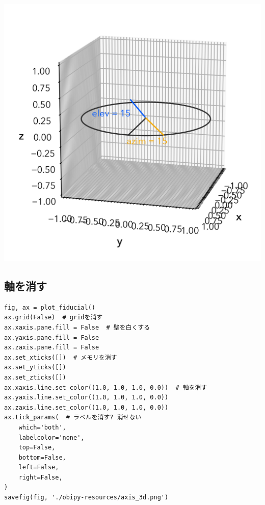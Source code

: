 \documentclass[a4paper, 10pt, notitlepage, twocolumn, uplatex, oneside, dvipdfmx]{jsarticle}
\begin{document}
\label{}
\begin{center}
\includegraphics[width=1.0\linewidth]{./obipy-resources/view_3d.png}
\end{center}
\subsection{軸を消す}
\label{sec:orgf355797}
\begin{verbatim}
fig, ax = plot_fiducial()
ax.grid(False)  # gridを消す
ax.xaxis.pane.fill = False  # 壁を白くする
ax.yaxis.pane.fill = False
ax.zaxis.pane.fill = False
ax.set_xticks([])  # メモリを消す
ax.set_yticks([])
ax.set_zticks([])
ax.xaxis.line.set_color((1.0, 1.0, 1.0, 0.0))  # 軸を消す
ax.yaxis.line.set_color((1.0, 1.0, 1.0, 0.0))
ax.zaxis.line.set_color((1.0, 1.0, 1.0, 0.0))
ax.tick_params(  # ラベルを消す? 消せない
    which='both',
    labelcolor='none',
    top=False,
    bottom=False,
    left=False,
    right=False,
)
savefig(fig, './obipy-resources/axis_3d.png')
\end{verbatim}
\end{document}
